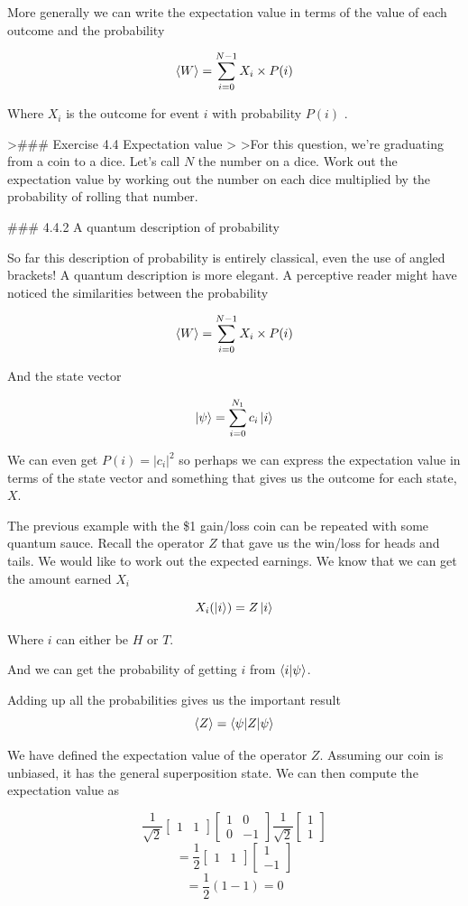 \documentclass{book}
\begin{document}
More generally we can write the expectation value in terms of the value of each outcome and the probability 

$$ \braket{W} = \sum_{i = 0}^{N-1} X_i \times P(i) $$

Where $X_i$ is the outcome for event $i$ with probability $P(i)$ . 

 
>### Exercise 4.4 Expectation value
>
>For this question, we're graduating from a coin to a dice. Let's call $N$ the number on a dice. Work out the expectation value by working out the number on each dice multiplied by the probability of rolling that number. 

### 4.4.2 A quantum description of probability 

So far this description of probability is entirely classical, even the use of angled brackets! A quantum description is more elegant. A perceptive reader might have noticed the similarities between the probability

$$ \braket{W} = \sum_{i = 0}^{N-1} X_i \times P(i) $$

And the state vector

$$
\ket{\psi} = \sum_{i = 0}^{N_1} c_i \ket{i}
$$ 

We can even get $P(i) = |c_i|^2$ so perhaps we can express the expectation value in terms of the state vector and something that gives us the outcome for each state,$X$. 

The previous example with the \$1 gain/loss coin can be repeated with some quantum sauce. Recall the operator $Z$ that gave us the win/loss for heads and tails. We would like to work out the expected earnings. We know that we can get the amount earned $X_i$

$$ X_i (\ket{i}) = Z\ket{i}$$

Where $i$ can either be $H$ or $T$. 

And we can get the probability of getting $i$ from $\braket{i|\psi}$.

Adding up all the probabilities gives us the important result
$$
\braket{Z} = \braket{\psi|Z|\psi}
$$

We have defined the expectation value of the operator $Z$. Assuming our coin is unbiased, it has the general superposition state. We can then compute the expectation value as

$$
\frac{1}{\sqrt{2}} \begin{bmatrix} 1 & 1 \end{bmatrix} \begin{bmatrix} 1 & 0 \\ 0 & -1 \end{bmatrix} \frac{1}{\sqrt{2}} \begin{bmatrix} 1 \\ 1 \end{bmatrix}
$$
$$
= \frac{1}{2}\begin{bmatrix} 1 & 1 \end{bmatrix} \begin{bmatrix} 1 \\ -1 \end{bmatrix}
$$
$$ = \frac{1}{2} ( 1 - 1) = 0 $$ 
\end{document}
